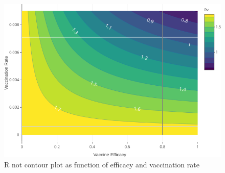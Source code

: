 \begin{figure}[tbh]
    \centering
    \includegraphics[scale=1.5, keepaspectratio]{Figures/R0_contour_1}
    \caption{R not contour plot as function of efficacy and vaccination rate}
    \label{fig:r0contour1}
\end{figure}


